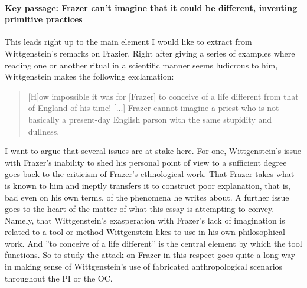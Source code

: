 \documentclass{article}
\begin{document}
\paragraph{Key passage: Frazer can't imagine that it could be different, inventing primitive practices}
This leads right up to the main element I would like to extract from Wittgenstein's remarks on Frazier. Right after giving a series of examples where reading one or another ritual  in a scientific manner seems ludicrous to him, Wittgenstein makes the following exclamation:
\begin{quote}
[H]ow impossible it was for [Frazer] to conceive of a life different from that of England of his time! [...] Frazer cannot imagine a priest who is not basically a present-day English parson with the same stupidity and dullness.
\end{quote}
I want to argue that several issues are at stake here. For one, Wittgenstein's issue with Frazer's inability to shed his personal point of view to a sufficient degree goes back to the criticism of Frazer's ethnological work. That Frazer takes what is known to him and ineptly transfers it to construct poor explanation, that is, bad even on his own terms, of the phenomena he writes about. A further issue goes to the heart of the matter of what this essay is attempting to convey. Namely, that Wittgenstein's exasperation with Frazer's lack of imagination is related to a tool or method Wittgenstein likes to use in his own philosophical work. And ''to conceive of a life different'' is the central element by which the tool functions. So to study the attack on Frazer in this respect goes quite a long way in making sense of Wittgenstein's use of fabricated anthropological scenarios throughout the PI or the OC. 
 
\end{document}
